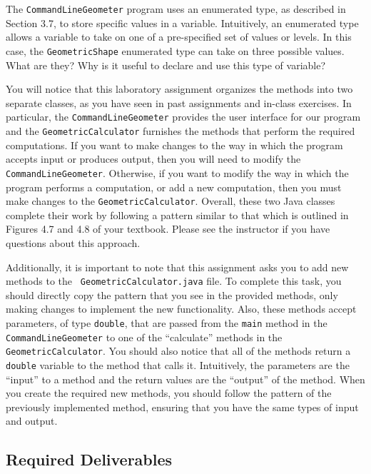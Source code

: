 The {\tt CommandLineGeometer} program uses an enumerated type, as described in Section 3.7, to store specific values in
a variable.  Intuitively, an enumerated type allows a variable to take on one of a pre-specified set of values or
levels.  In this case, the {\tt GeometricShape} enumerated type can take on three possible values.  What are they? Why
is it useful to declare and use this type of variable?

You will notice that this laboratory assignment organizes the methods into two separate classes, as you have seen in
past assignments and in-class exercises. In particular, the {\tt CommandLineGeometer} provides the user interface for
our program and the {\tt GeometricCalculator} furnishes the methods that perform the required computations.  If you want
to make changes to the way in which the program accepts input or produces output, then you will need to modify the {\tt
CommandLineGeometer}. Otherwise, if you want to modify the way in which the program performs a computation, or add a
new computation, then you must make changes to the {\tt GeometricCalculator}. Overall, these two Java classes complete
their work by following a pattern similar to that which is outlined in Figures 4.7 and 4.8 of your textbook. Please see
the instructor if you have questions about this approach.

Additionally, it is important to note that this assignment asks you to add new methods to the {\tt
GeometricCalculator.java} file.  To complete this task, you should directly copy the pattern that you see in the
provided methods, only making changes to implement the new functionality.  Also, these methods accept parameters, of
type {\tt double}, that are passed from the {\tt main} method in the {\tt CommandLineGeometer} to one of the
``calculate'' methods in the {\tt GeometricCalculator}. You should also notice that all of the methods return a {\tt
double} variable to the method that calls it.  Intuitively, the parameters are the ``input'' to a method and the return
values are the ``output'' of the method.  When you create the required new methods, you should follow the pattern of the
previously implemented method, ensuring that you have the same types of input and output.

\vspace*{-.1in}
\subsection*{Required Deliverables}
\vspace*{-.05in}

